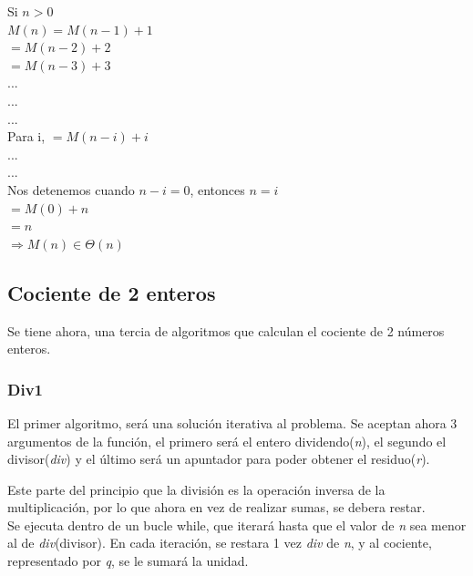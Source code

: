 \documentclass{report}
\begin{document}
\begin{itemize}
                \begin{multicols}{2}{}
                Si $n>0$\\
                    $M(n)=M(n-1)+1$\\
                    $=M(n-2)+2$\\
                    $=M(n-3)+3$\\
                    ...\\
                    ...\\
                    ...\\
                    Para i, $=M(n-i)+i$\\
                    ...\\
                    ...\\
                    Nos detenemos cuando $n-i=0$, entonces
                    $n=i$\\
                    $=M(0)+n$\\
                    $=n$\\
                    $\Rightarrow M(n)\in\Theta(n)$
                \end{multicols}
            \end{itemize}
    \subsection*{Cociente de 2 enteros}
        Se tiene ahora, una tercia de algoritmos que calculan el cociente de 2 números enteros.
        \subsubsection*{Div1}
            El primer algoritmo, ser\'a una solución iterativa al problema. Se aceptan ahora 3 argumentos de la función, el primero será el entero dividendo(\textit{n}), el segundo el divisor(\textit{div}) y el último será un apuntador para poder obtener el residuo(\textit{r}).
            
            Este parte del principio que la división es la operación inversa de la multiplicación, por lo que ahora en vez de realizar sumas, se debera restar.\\
            
            Se ejecuta dentro de un bucle while, que iterará hasta que el valor de \textit{n} sea menor al de \textit{div}(divisor). En cada iteración, se restara 1 vez \textit{div} de \textit{n}, y al cociente, representado por \textit{q}, se le sumará la unidad.\\
            
\end{document}
